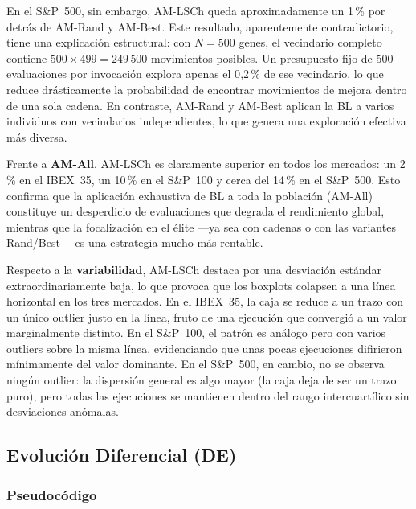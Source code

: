 En el S\&P~500, sin embargo, AM-LSCh queda aproximadamente un 1\,\% por detrás de AM-Rand y AM-Best. Este resultado, aparentemente contradictorio, tiene una explicación estructural: con $N=500$ genes, el vecindario completo contiene $500 \times 499 = 249\,500$ movimientos posibles. Un presupuesto fijo de 500 evaluaciones por invocación explora apenas el 0{,}2\,\% de ese vecindario, lo que reduce drásticamente la probabilidad de encontrar movimientos de mejora dentro de una sola cadena. En contraste, AM-Rand y AM-Best aplican la BL a varios individuos con vecindarios independientes, lo que genera una exploración efectiva más diversa.

Frente a \textbf{AM-All}, AM-LSCh es claramente superior en todos los mercados: un 2\,\% en el IBEX~35, un 10\,\% en el S\&P~100 y cerca del 14\,\% en el S\&P~500. Esto confirma que la aplicación exhaustiva de BL a toda la población (AM-All) constituye un desperdicio de evaluaciones que degrada el rendimiento global, mientras que la focalización en el élite ---ya sea con cadenas o con las variantes Rand/Best--- es una estrategia mucho más rentable.

Respecto a la \textbf{variabilidad}, AM-LSCh destaca por una desviación estándar extraordinariamente baja, lo que provoca que los boxplots colapsen a una línea horizontal en los tres mercados. En el IBEX~35, la caja se reduce a un trazo con un único outlier justo en la línea, fruto de una ejecución que convergió a un valor marginalmente distinto. En el S\&P~100, el patrón es análogo pero con varios outliers sobre la misma línea, evidenciando que unas pocas ejecuciones difirieron mínimamente del valor dominante. En el S\&P~500, en cambio, no se observa ningún outlier: la dispersión general es algo mayor (la caja deja de ser un trazo puro), pero todas las ejecuciones se mantienen dentro del rango intercuartílico sin desviaciones anómalas.

\subsection{Evolución Diferencial (DE)}

\subsubsection{Pseudocódigo}

